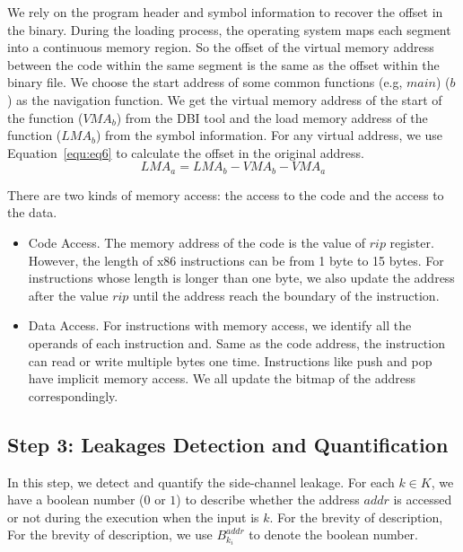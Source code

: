 We rely on the program header and symbol information to recover the offset in the binary. During the loading process, the operating system maps each segment into a continuous memory region. So the offset of the virtual memory address between the code within the same segment is the same as the offset within the binary file. We choose the start address of some common functions (e.g, $main$) ($b$) as the navigation function. We get the virtual memory address of the start of the function ($\mathit{VMA_b}$) from the DBI tool and the load memory address of the function ($\mathit{LMA_b}$) from the symbol information. For any virtual address, we use Equation~\ref{equ:eq6} to calculate the offset in the original address.
\begin{equation}\label{equ:eq6}
  \mathit{LMA_a} = \mathit{LMA_b} - VMA_b - VMA_a
\end{equation}

There are two kinds of memory access: the access to the code and the access to the data.
\begin{itemize}
  \item Code Access. The memory address of the code is the value of $rip$ register. However, the length of x86 instructions can be from 1 byte to 15 bytes. For instructions whose length is longer than one byte, we also update the address  after the value $rip$ until the address reach the boundary of the instruction.
  \item Data Access. For instructions with memory access, we identify all the operands of each instruction and. Same as the code address, the instruction can read or write multiple bytes one time.  Instructions like \textsf{push} and \textsf{pop} have implicit memory access. We all update the bitmap of the address correspondingly.
\end{itemize}

\subsection{Step 3: Leakages Detection and Quantification}
In this step, we detect and quantify the side-channel leakage. For each $k \in K$, we have a boolean number ($0$ or $1$) to describe whether the address $addr$ is accessed or not during the execution when the input is $k$. For the brevity of description, For the brevity of description, we use $B^{addr}_{k_i}$ to denote the boolean number.



